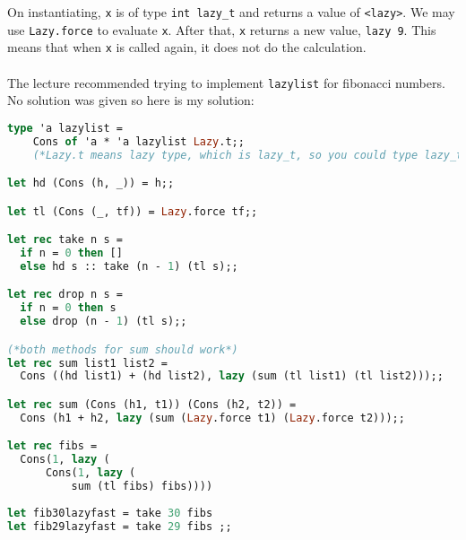\documentclass[12pt,a4paper]{article} %
\begin{document}
On instantiating, \verb|x| is of type \verb|int lazy_t| and returns a value of \verb|<lazy>|. We may use \verb|Lazy.force| to evaluate \verb|x|. After that, \verb|x| returns a new value, \verb|lazy 9|. This means that when \verb|x| is called again, it does not do the calculation.
\\\\
The lecture recommended trying to implement \verb|lazylist| for fibonacci numbers. No solution was given so here is my solution:
\begin{lstlisting}[language=Caml]
type 'a lazylist =
    Cons of 'a * 'a lazylist Lazy.t;;
    (*Lazy.t means lazy type, which is lazy_t, so you could type lazy_t instead!*)

let hd (Cons (h, _)) = h;;

let tl (Cons (_, tf)) = Lazy.force tf;;

let rec take n s = 
  if n = 0 then []
  else hd s :: take (n - 1) (tl s);;

let rec drop n s = 
  if n = 0 then s
  else drop (n - 1) (tl s);;

(*both methods for sum should work*)
let rec sum list1 list2 = 
  Cons ((hd list1) + (hd list2), lazy (sum (tl list1) (tl list2)));; 

let rec sum (Cons (h1, t1)) (Cons (h2, t2)) = 
  Cons (h1 + h2, lazy (sum (Lazy.force t1) (Lazy.force t2)));; 

let rec fibs =
  Cons(1, lazy (
      Cons(1, lazy (
          sum (tl fibs) fibs))))
    
let fib30lazyfast = take 30 fibs
let fib29lazyfast = take 29 fibs ;; 
\end{lstlisting}
\end{document}
